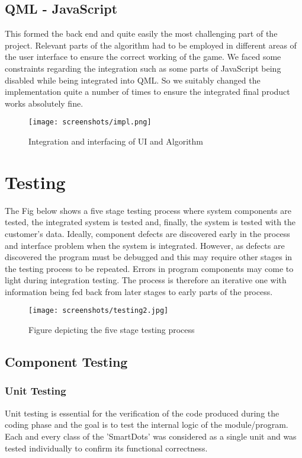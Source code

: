 \documentclass[a4paper,12pt]{article}
\begin{document}
\subsection{QML - JavaScript}
\hspace{18pt}This formed the back end and quite easily the most challenging part of the project. Relevant parts of the algorithm had to be employed in different areas of the user interface to ensure the correct working of the game. We faced some constraints regarding the integration such as some parts of JavaScript being disabled while being integrated into QML. So we suitably changed the implementation quite a number of times to ensure the integrated final product works absolutely fine.\\

\begin{figure}[htp]
\centering
\texttt{[image: screenshots/impl.png]}
\caption{Integration and interfacing of UI and Algorithm}
\end{figure}

\newpage
\section{Testing}
\hspace{18pt}The Fig below shows a five stage testing process where system components are tested, the integrated system is tested and, finally, the system is tested with the customer's data. Ideally, component defects are discovered early in the process and interface problem when the system is integrated. However, as defects are discovered the program must be debugged and this may require other stages in the testing process to be repeated. Errors in program components may come to light during integration testing. The process is therefore an iterative one with information being fed back from later stages to early parts of the process.\\

\begin{figure}[htp]
\centering
\texttt{[image: screenshots/testing2.jpg]}
\caption{Figure depicting the five stage testing process}
\end{figure}

\subsection{Component Testing}
\subsubsection{Unit Testing}
\hspace{18pt}Unit testing is essential for the verification of the code produced during the coding phase and the goal is to test the internal logic of the module/program. Each and every class of the 'SmartDots' was considered as a single unit and was tested individually to confirm its functional correctness.
\end{document}
